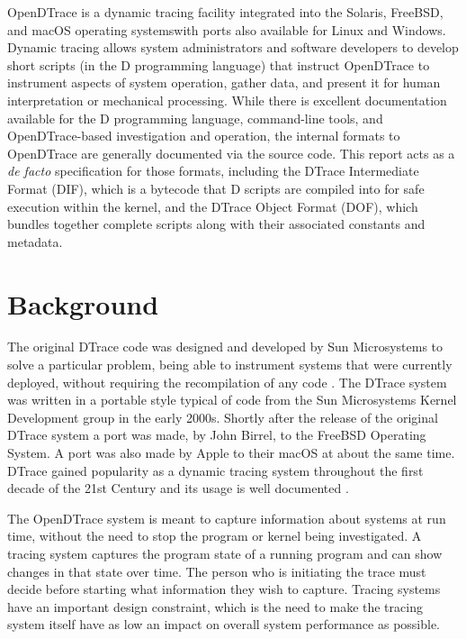 OpenDTrace is a dynamic tracing facility integrated into the Solaris,
FreeBSD, and macOS operating systems\textemdash with ports also available for
Linux and Windows.  Dynamic tracing allows system administrators and
software developers to develop short scripts (in the D programming
language) that instruct OpenDTrace to instrument aspects of system
operation, gather data, and present it for human interpretation or
mechanical processing.  While there is excellent documentation
available for the D programming language, command-line tools, and
OpenDTrace-based investigation and operation, the internal formats to
OpenDTrace are generally documented via the source code.  This report
acts as a \textit{de facto} specification for those formats, including the
DTrace Intermediate Format (DIF), which is a bytecode that D scripts
are compiled into for safe execution within the kernel, and the DTrace
Object Format (DOF), which bundles together complete scripts along
with their associated constants and metadata.

\section{Background}

The original DTrace code was designed and developed by Sun
Microsystems to solve a particular problem, being able to instrument
systems that were currently deployed, without requiring the
recompilation of any code \cite{DTrace2004}.  The DTrace system was
written in a portable style typical of code from the Sun Microsystems
Kernel Development group in the early 2000s.  Shortly after the
release of the original DTrace system a port was made, by John Birrel,
to the FreeBSD Operating System.  A port was also made by Apple to
their macOS at about the same time.  DTrace gained popularity as a
dynamic tracing system throughout the first decade of the 21st Century
and its usage is well documented
\cite{mckusick2014design}\cite{Microsystems2008a}\cite{Gregg:2011:DDT:1971960}.

The OpenDTrace system is meant to capture information about systems at
run time, without the need to stop the program or kernel being
investigated.
A tracing system captures the program state of a running program and
can show changes in that state over time.  The person who is
initiating the trace must decide before starting what information they
wish to capture.  Tracing systems have an important design constraint,
which is the need to make the tracing system itself have as low an
impact on overall system performance as possible.

